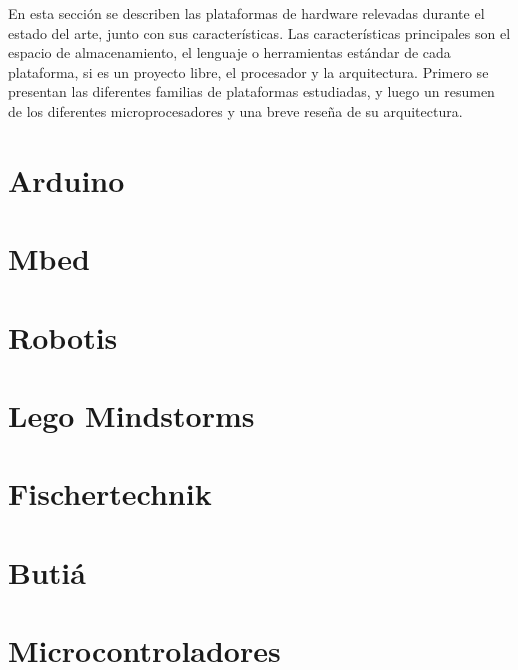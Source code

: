 
  En esta sección se describen las plataformas de hardware relevadas
durante el estado del arte, junto con sus características.
  Las características principales son el espacio de almacenamiento,
el lenguaje o herramientas estándar de cada plataforma, si es un
proyecto libre, el procesador y la arquitectura.
  Primero se presentan las diferentes familias de plataformas
estudiadas, y luego un resumen de los diferentes microprocesadores
y una breve reseña de su arquitectura.

\section{Arduino}


\section{Mbed}


\section{Robotis}


\section{Lego Mindstorms}


\section{Fischertechnik}


\section{Butiá}


\section{Microcontroladores}

